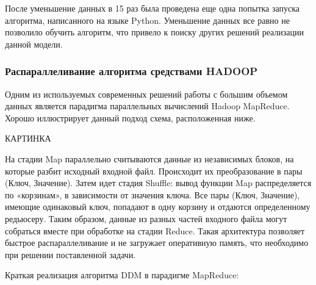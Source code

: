 После уменьшение данных в 15 раз была проведена еще одна попытка запуска алгоритма,
написанного на языке Python. Уменьшение данных все равно не позволило обучить
алгоритм, что привело к поиску других решений реализации данной модели.

\subsubsection{Распараллеливание алгоритма средствами HADOOP}

Одним из используемых современных решений работы с большим объемом данных
является парадигма параллельных вычислений Hadoop MapReduce. Хорошо иллюстрирует
данный подход схема, расположенная ниже.

КАРТИНКА

На стадии Map параллельно считываются данные из независимых блоков, на которые
разбит исходный входной файл. Происходит их преобразование в пары (Ключ, Значение).
Затем идет стадия Shuffle: вывод функции Map распределяется по «корзинам», в
зависимости от значения ключа. Все пары (Ключ, Значение), имеющие одинаковый ключ,
попадают в одну корзину и отдаются определенному редьюсеру. Таким образом, данные
из разных частей входного файла могут собраться вместе при обработке на стадии
Reduce. Такая архитектура позволяет быстрое распараллеливание и не загружает
оперативную память, что необходимо при решении поставленной задачи.

Краткая реализация алгоритма DDM в парадигме MapReduce:

